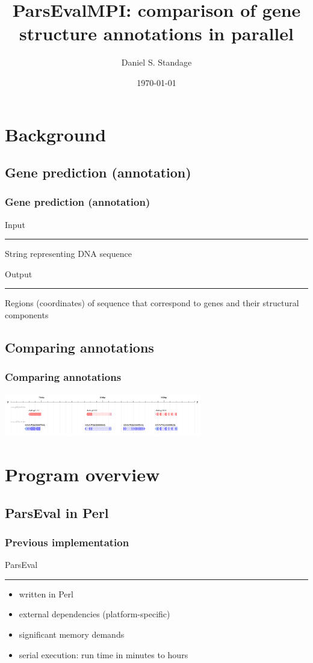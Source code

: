 \documentclass{beamer}
\title[ParsEvalMPI]{ParsEvalMPI: comparison of gene structure annotations in parallel}
\author{Daniel S. Standage}
\date{\today}
\institute[BCB]{Bioinformatics and Computational Biology}
\begin{document}
 

\begin{frame}
  \titlepage
\end{frame}

\section{Background}
\subsection{Gene prediction (annotation)}
\begin{frame}
  \frametitle{Gene prediction (annotation)}
  {\LARGE Input}
  \hrule
  \vspace{5px}
  String representing DNA sequence
  
  \vspace{30px}
  
  {\LARGE Output}
  \hrule
  \vspace{5px}
  Regions (coordinates) of sequence that correspond to genes and their structural components
\end{frame}

\subsection{Comparing annotations}
\begin{frame}
  \frametitle{Comparing annotations}
  \begin{center}
    \includegraphics[width=325px]{predictions.png}
  \end{center}
\end{frame}

\section{Program overview}
\subsection{ParsEval in Perl}
\begin{frame}
  \frametitle{Previous implementation}
  { \LARGE ParsEval }
  \vspace{1px}
  \hrule
  \vspace{10px}
  
  \begin{itemize}
    \item<1-> written in Perl
    \item<2-> external dependencies (platform-specific)
    \item<3-> significant memory demands
    \item<4-> serial execution: run time in minutes to hours
  \end{itemize}
\end{frame}
\end{document}
